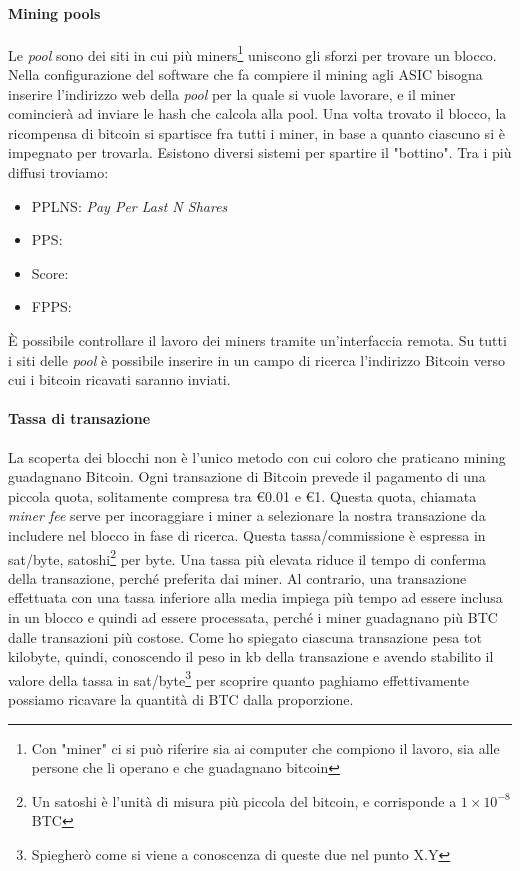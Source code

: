 \documentclass {article}
\begin{document}
\paragraph {Mining pools}


Le \textit{pool} sono dei siti in cui più miners\footnote{Con "miner" ci si può riferire sia ai computer che compiono il lavoro, sia alle persone che li operano e che guadagnano bitcoin} uniscono gli sforzi per trovare un blocco.
Nella configurazione del software che fa compiere il mining agli ASIC bisogna inserire l'indirizzo web della \textit{pool} per la quale si vuole lavorare, e il miner comincierà ad inviare le hash che calcola alla pool.
Una volta trovato il blocco, la ricompensa di bitcoin si spartisce fra tutti i miner, in base a quanto ciascuno si è impegnato per trovarla.
Esistono diversi sistemi per spartire il "bottino". Tra i più diffusi troviamo:

\begin{itemize}
\item PPLNS: \textit{Pay Per Last N Shares}
\item PPS:
\item Score:
\item FPPS:
\end{itemize}
%
È possibile controllare il lavoro dei miners tramite un'interfaccia remota. Su tutti i siti delle \textit{pool} è possibile inserire in un campo di ricerca l'indirizzo Bitcoin verso cui i bitcoin ricavati saranno inviati.

\paragraph {Tassa di transazione}

La scoperta dei blocchi non è l'unico metodo con cui coloro che praticano mining guadagnano Bitcoin.
Ogni transazione di Bitcoin prevede il pagamento di una piccola quota, solitamente compresa tra \euro{0.01} e \euro{1}.
Questa quota, chiamata \textit{miner fee} serve per incoraggiare i miner a selezionare la nostra transazione da includere nel blocco in fase di ricerca.
Questa tassa/commissione è espressa in sat/byte, satoshi\footnote{Un satoshi è l'unità di misura più piccola del bitcoin, e corrisponde a $1 \times 10^{-8}$ BTC} per byte.
Una tassa più elevata riduce il tempo di conferma della transazione, perché preferita dai miner. Al contrario, una transazione effettuata con una tassa inferiore alla media impiega più tempo ad essere inclusa in un blocco e quindi ad essere processata, perché i miner guadagnano più BTC dalle transazioni più costose.
Come ho spiegato ciascuna transazione pesa tot kilobyte, quindi, conoscendo il peso in kb della transazione e avendo stabilito il valore della tassa in sat/byte\footnote{Spiegherò come si viene a conoscenza di queste due nel punto X.Y} per scoprire quanto paghiamo effettivamente possiamo ricavare la quantità di BTC dalla proporzione.
\end{document}
